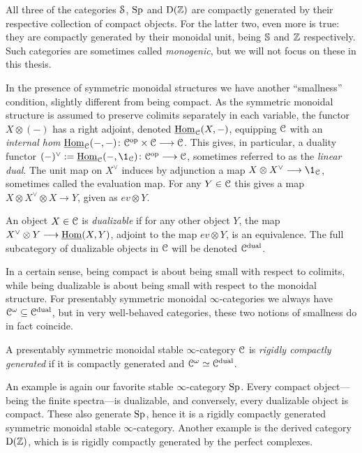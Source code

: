 All three of the categories $\Spaces$, $\Sp$ and $\Der(\Z)$ are compactly generated by their respective collection of compact objects. For the latter two, even more is true: they are compactly generated by their monoidal unit, being $\S$ and $\Z$ respectively. Such categories are sometimes called \emph{monogenic}, but we will not focus on these in this thesis. 

In the presence of symmetric monoidal structures we have another ``smallness'' condition, slightly different from being compact. As the symmetric monoidal structure is assumed to preserve colimits separately in each variable, the functor $X\otimes (-)$ has a right adjoint, denoted $\iHom_\C(X,-)$, equipping $\C$ with an \emph{internal hom} $\iHom_\C(-,-)\: \C\op\times \C\to \C$. This gives, in particular, a duality functor $(-)^\vee:=\iHom_\C(-,\1_\C)\: \C\op \to \C$, sometimes referred to as the \emph{linear dual}. The unit map on $X^\vee$ induces by adjunction a map $X\otimes X^\vee \to \1_\C$, sometimes called the evaluation map. For any $Y\in \C$ this gives a map $X\otimes X^\vee \otimes X\to Y$, given as $ev \otimes Y$. 

\begin{definition}
    \label{ch0:def:dualizable-object}
    An object $X\in \C$ is \emph{dualizable} if for any other object $Y$, the map $X^\vee\otimes Y\to \iHom(X,Y)$, adjoint to the map $ev\otimes Y$, is an equivalence. The full subcategory of dualizable objects in $\C$ will be denoted $\C\dual$. 
\end{definition}

In a certain sense, being compact is about being small with respect to colimits, while being dualizable is about being small with respect to the monoidal structure. For presentably symmetric monoidal $\infty$-categories we always have $\Co\subseteq \C\dual$, but in very well-behaved categories, these two notions of smallness do in fact coincide. 

\begin{definition}
    \label{ch0:rigidly-generated-category}
    A presentably symmetric monoidal stable $\infty$-category $\C$ is \emph{rigidly compactly generated} if it is compactly generated and $\Co\simeq \C\dual$. 
\end{definition}

\begin{example}
    An example is again our favorite stable $\infty$-category $\Sp$. Every compact object---being the finite spectra---is dualizable, and conversely, every dualizable object is compact. These also generate $\Sp$, hence it is a rigidly compactly generated symmetric monoidal stable $\infty$-category. Another example is the derived category $\Der(\Z)$, which is is rigidly compactly generated by the perfect complexes. 
\end{example}

